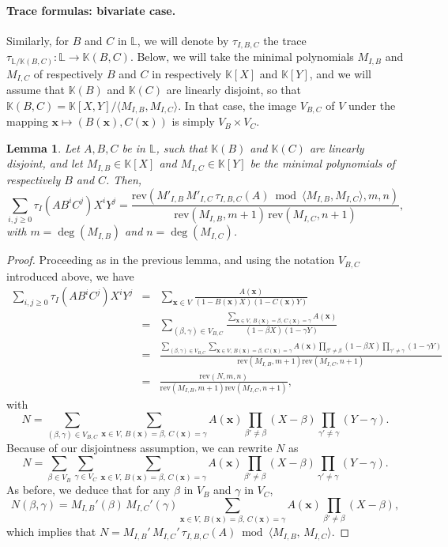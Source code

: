 \documentclass[12pt]{article}
\def\K {\ensuremath{\mathbb{K}}}
\def\L {\ensuremath{\mathbb{L}}}
\def\rev {\ensuremath{\mathrm{rev}}}
\def\x {\ensuremath{\mathbf{x}}}
\newtheorem{Lemma}{Lemma}
\begin{document}
\paragraph{Trace formulas: bivariate case.} 
Similarly, for $B$ and $C$ in $\L$, we will denote by $\tau_{I,B,C}$
the trace $\tau_{\L/\K(B,C)}: \L \to \K(B,C)$. Below, we will take the
minimal polynomials $M_{I,B}$ and $M_{I,C}$ of respectively $B$ and
$C$ in respectively $\K[X]$ and $\K[Y]$, and we will assume that
$\K(B)$ and $\K(C)$ are linearly disjoint, so that $\K(B,C) =
\K[X,Y]/\langle M_{I,B}, M_{I,C}\rangle$. In that case, the image
$V_{B,C}$ of $V$ under the mapping $\x \mapsto (B(\x),C(\x))$ is simply
$V_B \times V_C$.

\begin{Lemma}
  Let $A, B, C$ be in  $\L$, 
  such that $\K(B)$ and $\K(C)$ are linearly disjoint,
  and let $M_{I,B}\in \K[X]$ and  $M_{I,C}\in \K[Y]$ be the minimal polynomials
  of respectively $B$ and $C$. Then,
  $$\sum_{i,j \ge 0} \tau_I(A B^i C^j) X^i Y^j= 
  \frac{\rev( M'_{I,B}\, M'_{I,C}\, \tau_{I,B,C} (A) \bmod \langle M_{I,B}, M_{I,C}\rangle,m,n)}{\rev(M_{I,B},m+1)\, \rev(M_{I,C},n+1)},$$
  with $m=\deg(M_{I,B})$ and $n=\deg(M_{I,C})$.
\end{Lemma}
\begin{proof}
Proceeding as in the previous lemma, and using the notation $V_{B,C}$ introduced
above, we have
\begin{eqnarray*}
\sum_{i,j \ge 0} \tau_I(A B^i C^j) X^i Y^j &=& \sum_{\x \in V}  \frac{A(\x)}{(1-B(\x)X)(1-C(\x)Y)}\\
&=& \sum_{(\beta,\gamma) \in V_{B,C}} \frac{\sum_{\x \in V,\, B(\x)=\beta,\, C(\x)=\gamma} A(\x)}{(1-\beta X)(1-\gamma Y)}\\
&=&\frac{\sum_{(\beta,\gamma) \in V_{B,C}} \sum_{\x \in V,\, B(\x)=\beta,\, C(\x)=\gamma} A(\x)
  \prod_{\beta'\ne \beta} (1-\beta X) \prod_{\gamma' \ne \gamma} (1-\gamma Y)}
  {\rev(M_{I,B},m+1) \rev(M_{I,C},n+1) }\\
&=& \frac{\rev(N,m,n)}  {\rev(M_{I,B},m+1) \rev(M_{I,C},n+1) },
\end{eqnarray*}
with 
$$N = \sum_{(\beta,\gamma) \in V_{B,C}} \sum_{\x \in V,\, B(\x)=\beta,\, C(\x)=\gamma} A(\x)
  \prod_{\beta'\ne \beta} (X-\beta ) \prod_{\gamma' \ne \gamma} (Y-\gamma ).$$
Because of our disjointness assumption, we can rewrite $N$ as 
$$N = \sum_{\beta \in V_B} \sum_{\gamma \in V_C} \sum_{\x \in V,\, B(\x)=\beta,\, C(\x)=\gamma} A(\x)
  \prod_{\beta'\ne \beta} (X-\beta ) \prod_{\gamma' \ne \gamma} (Y-\gamma ).$$
As before, we deduce that for any $\beta$ in $V_B$ and $\gamma$ in $V_C$, 
$$N(\beta,\gamma)= M_{I,B}'(\beta)\, M_{I,C}'(\gamma) \sum_{\x \in V,\, B(\x)=\beta,\, C(\x)=\gamma} A(\x)
  \prod_{\beta'\ne \beta} (X-\beta ),$$
which implies that 
$N=M_{I,B}'\, M_{I,C}'\, \tau_{I,B,C}(A) \bmod \langle M_{I,B},\, M_{I,C}\rangle$.
\end{proof}
\end{document}
